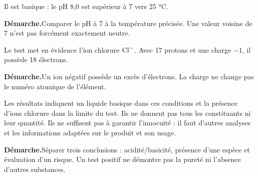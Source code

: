 \par\noindent\begin{minipage}{\linewidth}Il est basique : le pH 8,0 est supérieur à 7 vers 25 °C.\par\smallskip\textbf{Démarche.}\enspace Comparer le pH à 7 à la température précisée. Une valeur voisine de 7 n’est pas forcément exactement neutre.\par{}\end{minipage}\par
\par\noindent\begin{minipage}{\linewidth}Le test met en évidence l’ion chlorure $\ce{Cl-}$. Avec 17 protons et une charge $-1$, il possède 18 électrons.\par\smallskip\textbf{Démarche.}\enspace Un ion négatif possède un excès d’électrons. La charge ne change pas le numéro atomique de l’élément.\par{}\end{minipage}\par
\par\noindent\begin{minipage}{\linewidth}Les résultats indiquent un liquide basique dans ces conditions et la présence d’ions chlorure dans la limite du test. Ils ne donnent pas tous les constituants ni leur quantité. Ils ne suffisent pas à garantir l’innocuité : il faut d’autres analyses et les informations adaptées sur le produit et son usage.\par\smallskip\textbf{Démarche.}\enspace Séparer trois conclusions : acidité/basicité, présence d’une espèce et évaluation d’un risque. Un test positif ne démontre pas la pureté ni l’absence d’autres substances.\par{}\end{minipage}\par
{}
